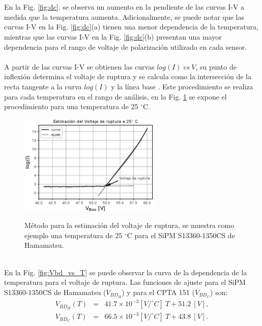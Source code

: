 \\ \\
En la Fig. \ref{fig:dc}. se observa un aumento en la pendiente de las curvas I-V a medida que la temperatura aumenta. Adicionalmente, se puede notar que las curvas I-V en la Fig. \ref{fig:dc}(a) tienen una menor dependencia de la temperatura, mientras que las curvas I-V en la Fig. \ref{fig:dc}(b) presentan una mayor dependencia para el rango de voltaje de polarización utilizado en cada sensor.
\\ \\
A partir de las curvas I-V se obtienen las curvas $log(I)~vs~V$, su punto de inflexión determina el voltaje de ruptura y se calcula como la intersección de la recta tangente a la curva  $log(I)$ y la línea base \citep{MPPC_note, Ruptura_metodo}. Este procedimiento se realiza para cada temperatura en el rango de análisis, en la Fig. \ref{fig:ruptura} se expone el procedimiento para una temperatura de 25 $^\circ$C.
\begin{figure}[h!]
\begin{centering}
  \caption{Método para la estimación del voltaje de ruptura, se muestra como ejemplo una temperatura de 25 $^\circ$C para el SiPM S13360-1350CS de Hamamatsu.}
    \includegraphics[width=0.6\textwidth]{Images/cal_voltaje_ruptura.eps}
  \label{fig:ruptura}
  \par\end{centering}
\end{figure}
\\
En la Fig. \ref{fig:Vbd_vs_T} se puede observar la curva de la dependencia de la temperatura para el voltaje de ruptura. Las funciones de ajuste para el SiPM S13360-1350CS de Hamamatsu ($V_{BD_{H}}$) y para el CPTA 151 ($V_{BD_{C}}$) son:
\begin{eqnarray}
V_{BD_{H}}(T) &=& 41.7\times10^{-3}[V/^\circ C]~T + 51.2~[V],\\
V_{BD_{C}}(T) &=& 66.5\times10^{-3}[V/^\circ C]~T+ 43.8~[V].
\end{eqnarray}
